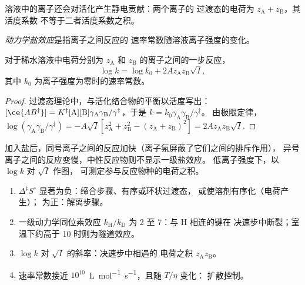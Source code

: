 溶液中的离子还会对活化产生静电贡献：两个离子的
过渡态的电荷为 $z_{\mathrm A} + z_{\mathrm B}$，其活度系数
不等于二者活度系数之积。

\begin{definition}[动力学盐效应]\label{def:b3:rate-theories:salt}
\emph{动力学盐效应}是指离子之间反应的
速率常数随溶液离子强度的变化。
\end{definition}

\begin{proposition}\label{prop:b3:rate-theories:bronsted-bjerrum}
对于稀水溶液中电荷分别为 $z_{\mathrm A}$ 和 $z_{\mathrm B}$ 的离子之间的一步反应，
\[
  \log k = \log k_0 + 2Az_{\mathrm A}z_{\mathrm B}\sqrt I,
\]
其中 $k_0$ 为离子强度为零时的速率常数。
\end{proposition}

\begin{proof}
过渡态理论中，与活化络合物的平衡以活度写出：
$[\ce{AB^{\ddagger}}] = K^{\ddagger}[\mathrm A][\mathrm B]\gamma_{\mathrm A}\gamma_{\mathrm B}/\gamma^{\ddagger}$，于是 $k = k_0\gamma_{\mathrm A}\gamma_{\mathrm B}/\gamma^{\ddagger}$。
由极限定律，$\log(\gamma_{\mathrm A}\gamma_{\mathrm B}/\gamma^{\ddagger}) = -A\sqrt I[z_{\mathrm A}^2 + z_{\mathrm B}^2 - (z_{\mathrm A} + z_{\mathrm B})^2] =
2Az_{\mathrm A}z_{\mathrm B}\sqrt I$.
\end{proof}

加入盐后，同号离子之间的反应加快（离子氛屏蔽了它们之间的排斥作用），
异号离子之间的反应变慢，中性反应物则不显示一级盐效应。
低离子强度下，以 $\log k$ 对 $\sqrt I$ 作图，
可测定参与反应物种的电荷之积。

\begin{method}[活化参数如何揭示反应机理]\label{met:b3:rate-theories:mechanism-evidence}
\begin{enumerate}
  \item $\Delta^{\ddagger}S^\circ$ 显著为负：缔合步骤、有序或环状过渡态，
        或使溶剂有序化（电荷产生）；
        为正：解离步骤。
  \item 一级动力学同位素效应 $k_{\mathrm H}/k_{\mathrm D}$ 为 2 至 7：与 H 相连的键在
        决速步中断裂；室温下约高于 10 时则为隧道效应。
  \item $\log k$ 对 $\sqrt I$ 的斜率：决速步中相遇的
        电荷之积 $z_{\mathrm A}z_{\mathrm B}$。
  \item 速率常数接近 $10^{10}$~\unit{L.mol^{-1}.s^{-1}}，且随 $T/\eta$ 变化：
        扩散控制。
\end{enumerate}
\end{method}

